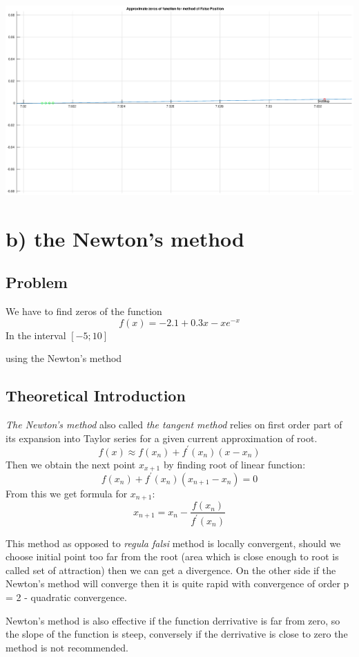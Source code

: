 \documentclass[12pt]{report}
\begin{document}
\begin{center}
   \includegraphics[scale=0.25]{task1falsepositionzommedright.eps}
\end{center}

\section{b) the Newton's method}


\subsection{Problem}

We have to find zeros of the function
\[ f(x) = -2.1 + 0.3x - xe^{-x} \]
In the interval $[-5; 10]$

using the Newton's method
\subsection{Theoretical Introduction}
\emph{The Newton's method} also called \emph{the tangent method} relies on first order part of its expansion into Taylor series for a given current approximation of root.
\[ f(x) \approx f(x_n) + f^{'}(x_n)(x-x_n) \]
Then we obtain the next point $x_{x+1}$ by finding root of linear function:
\[ f(x_n) + f^{'}(x_n)(x_{n+1}-x_n) = 0 \]
From this we get formula for $x_{n+1}$:
\[ x_{n+1} = x_n - \frac{f(x_n)}{f^{'}(x_n)} \]

This method as opposed to \emph{regula falsi} method is locally convergent, should we choose initial point too far from the root (area which is close enough to root is called set of attraction) then we can get a divergence. On the other side if the Newton's method will converge then it is quite rapid with convergence of order p = 2 - quadratic convergence.

Newton's method is also effective if the function derrivative is far from zero, so the slope of the function is steep, conversely if the derrivative is close to zero the method is not recommended.
\end{document}

